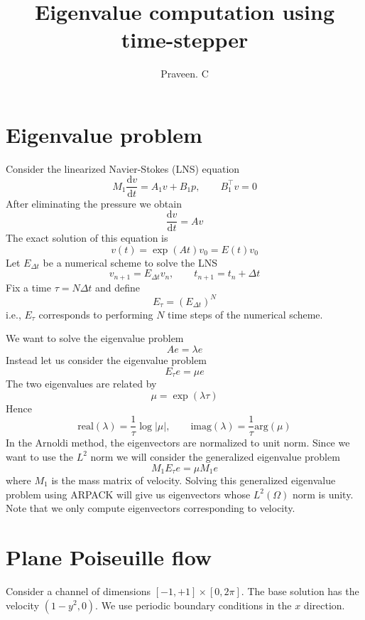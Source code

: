 \documentclass[12pt, oneside]{article}   	%
\title{Eigenvalue computation using time-stepper}
\author{Praveen. C}
\newcommand{\ud}{\textrm{d}}
\newcommand{\dd}[2]{\frac{\ud #1}{\ud #2}}
\newcommand{\Edt}{E_{\Delta t}}
\begin{document}
\maketitle
\section{Eigenvalue problem}
Consider the linearized Navier-Stokes (LNS) equation
\[
M_1 \dd{v}{t} = A_1 v + B_1 p, \qquad B_1^\top v = 0
\]
After eliminating the pressure we obtain
\[
\dd{v}{t} = Av
\]
The exact solution of this equation is
\[
v(t) = \exp(A t) v_0 = E(t) v_0
\]
Let $\Edt$ be a numerical scheme to solve the LNS
\[
v_{n+1} = \Edt v_n, \qquad t_{n+1} = t_n + \Delta t
\]
Fix a time $\tau = N\Delta t$ and define
\[
E_\tau = (\Edt)^N
\]
i.e., $E_\tau$ corresponds to performing $N$ time steps of the numerical scheme.

We want to solve the eigenvalue problem
\[
A e = \lambda e
\]
Instead let us consider the eigenvalue problem
\[
E_\tau e = \mu e
\]
The two eigenvalues are related by
\[
\mu = \exp(\lambda \tau)
\]
Hence
\[
\textrm{real}(\lambda) = \frac{1}{\tau} \log|\mu|, \qquad \textrm{imag}(\lambda) = \frac{1}{\tau} \textrm{arg}(\mu)
\]
In the Arnoldi method, the eigenvectors are normalized to unit norm. Since we want to use the $L^2$ norm we will consider the generalized eigenvalue problem
\[
M_1 E_\tau e = \mu M_1 e
\]
where $M_1$ is the mass matrix of velocity. Solving this generalized eigenvalue problem using ARPACK will give us eigenvectors whose $L^2(\Omega)$ norm is unity. Note that we only compute eigenvectors corresponding to velocity.

\section{Plane Poiseuille flow}
Consider a channel of dimensions $[-1,+1] \times [0, 2\pi]$. The base solution has the velocity $(1-y^2, 0)$. We use periodic boundary conditions in the $x$ direction.
\end{document}
